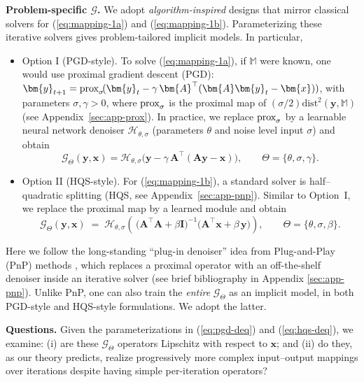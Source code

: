 \documentclass{amsart} %
\def\eqref#1{equation~\ref{#1}}
\def\vx{{\bm{x}}}
\def\vy{{\bm{y}}}
\def\mA{{\bm{A}}}
\def\mI{{\bm{I}}}
\def\sM{{\mathbb{M}}}
\def\cG{{\mathcal{G}}}
\def\cH{{\mathcal{H}}}
\theoremstyle{definition}
\theoremstyle{remark}
\renewcommand{\eqref}[1]{\textup{(\ref{#1})}}
\begin{document}
\textbf{Problem-specific $\cG$.}
We adopt \emph{algorithm-inspired} designs that mirror classical solvers for \eqref{eq:mapping-1a} and \eqref{eq:mapping-1b}.
Parameterizing these iterative solvers gives {problem-tailored implicit models}. In particular,
\begin{itemize}[leftmargin=5mm]
\item {Option I (PGD-style).}
To solve \eqref{eq:mapping-1a}, if \(\sM\) were known, one would use proximal gradient descent (PGD): $\vy_{t+1} = \textup{prox}_{\sigma}\!(\vy_t - \gamma\,\mA^\top(\mA\vy_t-\vx))$, with parameters \(\sigma,\gamma>0\), where \(\textup{prox}_{\sigma}\) is the proximal map of \(({\sigma}/{2}) \mathrm{dist}^2(\vy,\sM)\) (see Appendix~\ref{sec:app-prox}). 
In practice, we replace \(\textup{prox}_{\sigma}\) by a learnable neural network denoiser \(\cH_{\theta,\sigma}\) (parameters $\theta$ and noise level input $\sigma$) and obtain
\begin{equation}
\label{eq:pgd-deq}
\cG_{\Theta}(\vy,\vx)
= \cH_{\theta,\sigma}\!\Big(\vy - \gamma\,\mA^\top(\mA\vy-\vx)\Big),
\qquad
\Theta=\{\theta,\sigma,\gamma\}.
\end{equation}
\item {Option II (HQS-style).}
For \eqref{eq:mapping-1b}, a standard solver is half–quadratic splitting (HQS, see Appendix~\ref{sec:app-pnp}). 
Similar to Option~I, we replace the proximal map by a learned module and obtain 
\begin{equation}
\label{eq:hqs-deq}
\cG_{\Theta}(\vy,\vx)
\;=\;
\cH_{\theta,\sigma}\!\left(\,\big(\mA^\top\mA+\beta\mI\big)^{-1}\!\big(\mA^\top\vx+\beta\,\vy\big)\right),
\qquad
\Theta=\{\theta,\sigma,\beta\}.
\end{equation}
\end{itemize}
Here we follow the long-standing “plug-in denoiser” idea from Plug-and-Play (PnP) methods \cite{venkatakrishnan2013plug}, which replaces a proximal operator with an off-the-shelf denoiser inside an iterative solver (see brief bibliography in Appendix \ref{sec:app-pnp}). Unlike PnP, one can also train the \emph{entire} $\cG_\Theta$ as an implicit model, in both PGD-style \cite{gilton2021deep,winston2020monotone,zou2023deep,yu2024msdc,daniele2025deep,shenoy2025recovering} and HQS-style \cite{gkillas2023optimization} formulations. We adopt the latter.



\textbf{Questions.} Given the parameterizations in \eqref{eq:pgd-deq} and \eqref{eq:hqs-deq}, we examine: (i) are these $\cG_{\Theta}$ operators Lipschitz with respect to $\vx$; and (ii) do they, as our theory predicts, realize progressively more complex input–output mappings over iterations despite having simple per-iteration operators? 
\end{document}
